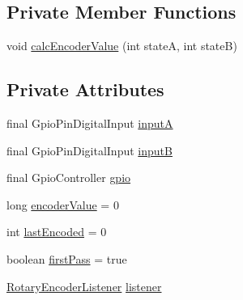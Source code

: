 \subsection*{Private Member Functions}
\begin{DoxyCompactItemize}
\item 
void \hyperlink{classcom_1_1libsensorj_1_1concretesensor_1_1RotaryEncoder_a86e3fc87eab21e3053cee532b52f7375}{calc\+Encoder\+Value} (int state\+A, int state\+B)
\end{DoxyCompactItemize}
\subsection*{Private Attributes}
\begin{DoxyCompactItemize}
\item 
final Gpio\+Pin\+Digital\+Input \hyperlink{classcom_1_1libsensorj_1_1concretesensor_1_1RotaryEncoder_a8db79599c8930effdf715796115c6739}{input\+A}
\item 
final Gpio\+Pin\+Digital\+Input \hyperlink{classcom_1_1libsensorj_1_1concretesensor_1_1RotaryEncoder_a7245c0e7d71506be358c5d833332630e}{input\+B}
\item 
final Gpio\+Controller \hyperlink{classcom_1_1libsensorj_1_1concretesensor_1_1RotaryEncoder_a689ac7cee2c3bd03c75f50e727943f49}{gpio}
\item 
long \hyperlink{classcom_1_1libsensorj_1_1concretesensor_1_1RotaryEncoder_a4d4be597b70b91b9a24d9f76d6bde510}{encoder\+Value} = 0
\item 
int \hyperlink{classcom_1_1libsensorj_1_1concretesensor_1_1RotaryEncoder_a99d34b4a390d2c2a5eeab7b5fef665ae}{last\+Encoded} = 0
\item 
boolean \hyperlink{classcom_1_1libsensorj_1_1concretesensor_1_1RotaryEncoder_a7b7d95bbeb4dc1a7ad8aeedf550d53f3}{first\+Pass} = true
\item 
\hyperlink{interfacecom_1_1libsensorj_1_1listeners_1_1RotaryEncoderListener}{Rotary\+Encoder\+Listener} \hyperlink{classcom_1_1libsensorj_1_1concretesensor_1_1RotaryEncoder_ae96674e284081057117e66d9bf2940ea}{listener}
\end{DoxyCompactItemize}

